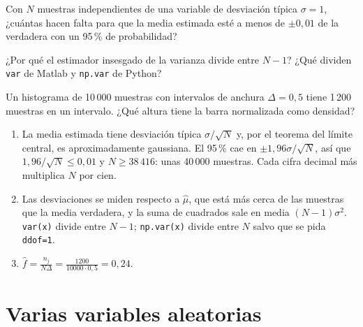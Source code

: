 \documentclass[11pt,a4paper]{scrartcl}
\begin{document}
\begin{ejercicio}
  \begin{incisos}[1]
    \item Con $N$ muestras independientes de una variable de desviación típica $\sigma=1$, ¿cuántas hacen falta para que la media estimada esté a menos de $\pm0{,}01$ de la verdadera con un 95\,\% de probabilidad?
    \item ¿Por qué el estimador insesgado de la varianza divide entre $N-1$? ¿Qué dividen \texttt{var} de Matlab y \texttt{np.var} de Python?
    \item Un histograma de 10\,000 muestras con intervalos de anchura $\Delta=0{,}5$ tiene 1\,200 muestras en un intervalo. ¿Qué altura tiene la barra normalizada como densidad?
  \end{incisos}
\end{ejercicio}
\begin{solucion}
  \begin{enumerate}[label=\alph*)]
    \item La media estimada tiene desviación típica $\sigma/\sqrt N$ y, por el teorema del límite central, es aproximadamente gaussiana. El 95\,\% cae en $\pm1{,}96\sigma/\sqrt N$, así que $1{,}96/\sqrt N\le0{,}01$ y $N\ge38\,416$: unas 40\,000 muestras. Cada cifra decimal más multiplica $N$ por cien.
    \item Las desviaciones se miden respecto a $\hat\mu$, que está más cerca de las muestras que la media verdadera, y la suma de cuadrados sale en media $(N-1)\sigma^2$. \texttt{var(x)} divide entre $N-1$; \texttt{np.var(x)} divide entre $N$ salvo que se pida \texttt{ddof=1}.
    \item $\hat f=\frac{n_j}{N\Delta}=\frac{1200}{10000\cdot0{,}5}=0{,}24$.
  \end{enumerate}
\end{solucion}

\section*{Varias variables aleatorias}
\end{document}
